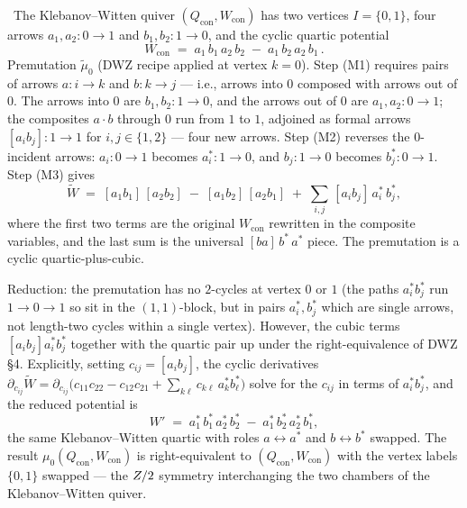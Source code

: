 \begin{example}
\label{ex:conifold-seiberg-duality}
\ClaimStatusDerivation\ The Klebanov--Witten quiver
$(Q_{\mathrm{con}}, W_{\mathrm{con}})$ has two vertices
$I = \{0, 1\}$, four arrows $a_1, a_2 \colon 0 \to 1$ and $b_1, b_2 \colon 1
\to 0$, and the cyclic quartic potential
\[
  W_{\mathrm{con}} \;=\; a_1\, b_1\, a_2\, b_2 \;-\; a_1\, b_2\, a_2\, b_1 \,.
\]
Premutation $\tilde\mu_0$ (DWZ recipe applied at vertex $k = 0$). Step
(M1) requires pairs of arrows $a \colon i \to k$ and $b \colon k \to j$
--- i.e., arrows into $0$ composed with arrows out of $0$. The arrows into
$0$ are $b_1, b_2 \colon 1 \to 0$, and the arrows out of $0$ are $a_1,
a_2 \colon 0 \to 1$; the composites $a \cdot b$ through $0$ run from
$1$ to $1$, adjoined as formal arrows $[a_i b_j] \colon 1 \to 1$ for
$i, j \in \{1, 2\}$ --- four new arrows.
Step (M2) reverses the $0$-incident arrows: $a_i \colon 0 \to 1$ becomes
$a_i^* \colon 1 \to 0$, and $b_j \colon 1 \to 0$ becomes $b_j^* \colon 0
\to 1$. Step (M3) gives
\[
  \tilde W \;=\; [a_1 b_1]\,[a_2 b_2] \;-\; [a_1 b_2]\,[a_2 b_1]
  \;+\; \sum_{i, j}\, [a_i b_j]\, a_i^{*}\, b_j^{*},
\]
where the first two terms are the original $W_{\mathrm{con}}$ rewritten
in the composite variables, and the last sum is the universal $[ba]\, b^*\,
a^*$ piece. The premutation is a cyclic quartic-plus-cubic.

Reduction: the premutation has no $2$-cycles at vertex $0$ or $1$ (the
paths $a_i^* b_j^*$ run $1 \to 0 \to 1$ so sit in the $(1, 1)$-block, but
in pairs $a_i^*, b_j^*$ which are single arrows, not length-two cycles
within a single vertex). However, the cubic terms $[a_i b_j] a_i^* b_j^*$
together with the quartic pair up under the right-equivalence of DWZ \S4.
Explicitly, setting $c_{ij} = [a_i b_j]$, the cyclic derivatives
$\partial_{c_{ij}} \tilde W = \partial_{c_{ij}}\!\bigl(c_{11} c_{22} -
c_{12} c_{21} + \sum_{k\ell} c_{k\ell}\, a_k^* b_\ell^*\bigr)$ solve for
the $c_{ij}$ in terms of $a_i^* b_j^*$, and the reduced potential is
\[
  W' \;=\; a_1^*\, b_1^*\, a_2^*\, b_2^* \;-\; a_1^*\, b_2^*\, a_2^*\, b_1^*,
\]
the same Klebanov--Witten quartic with roles $a \leftrightarrow a^*$ and
$b \leftrightarrow b^*$ swapped. The result $\mu_0(Q_{\mathrm{con}},
W_{\mathrm{con}})$ is right-equivalent to $(Q_{\mathrm{con}}, W_{\mathrm{con}})$
with the vertex labels $\{0, 1\}$ swapped --- the $Z/2$ symmetry
interchanging the two chambers of the Klebanov--Witten quiver.


\end{example}
